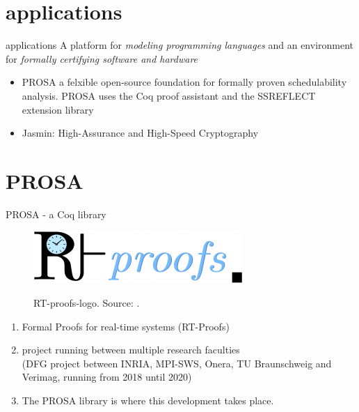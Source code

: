 \documentclass{beamer}
\begin{document}

	
	\section{applications}
	
	
	\begin{frame}{applications}
		 A platform for {\itshape modeling programming languages} and an environment for {\itshape formally certifying software and hardware}
	     \begin{itemize}
	     \item PROSA a felxible open-source foundation for formally proven schedulability analysis. PROSA uses the Coq proof assistant and the SSREFLECT extension library \cite{PROSA_ECRTS16ArtifcatEvaluation} 
	     \item Jasmin: High-Assurance and High-Speed Cryptography \cite{JASMIN}
	     \end{itemize}
	\end{frame}
	
	
	\section{PROSA}
	
	\begin{frame}{PROSA - a Coq library}
		\begin{figure}[h]
			\includegraphics[width=.4\textwidth]{logo_RT-proofs.png}
			\label{fig:RT-proofs-logo}
			\caption{RT-proofs-logo. Source: \cite{RTproofs}.} %
		\end{figure}
		\begin{enumerate}
			\item Formal Proofs for real-time systems (RT-Proofs)
			\item project running between multiple research faculties\\
			  (DFG project between INRIA, MPI-SWS, Onera, TU Braunschweig and Verimag, running from 2018 until 2020)
			\item The PROSA library is where this development takes place.%
		\end{enumerate}	
	\end{frame}
	
\end{document}
